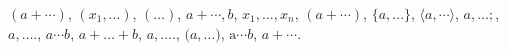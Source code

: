 \documentclass{article}
\begin{document}
$(a+\cdots)$,
$(x_1,\dots)$,
$(\ldots)$,
$a+\cdots, b$,
$x_1,\dots, x_n$,
$\left(a+\cdots\right)$,
$\{a,\dotsc\}$,
$\langle a,\dotsb\rangle$,
$a,\dotsc;$,
$a,\dotso.$,
$a\cdots b$,
$a + \dots + b$,
$a,\dots.$,
$\bigl(a,\dots\bigr)$,
$\mathrm{a\cdots}b$,
$a+\cdots$.
\end{document}
